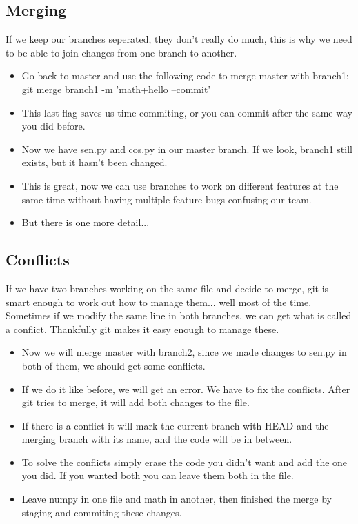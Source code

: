 \documentclass{beamer}
\begin{document}
\subsection{Merging}
\begin{frame}
If we keep our branches seperated, they don't really do much, this is why we 
need to be able to join changes from one branch to another.
\begin{itemize}
\item Go back to master and use the following code to merge master with 
branch1: git merge branch1 -m 'math+hello --commit'
\item This last flag saves us time commiting, or you can commit after the same 
way you did before.
\item Now we have sen.py and cos.py in our master branch. If we look, branch1 
still exists, but it hasn't been changed.
\item This is great, now we can use branches to work on different features at 
the same time without having multiple feature bugs confusing our team.
\item But there is one more detail...
\end{itemize}
\end{frame}

\subsection{Conflicts}
\begin{frame}
If we have two branches working on the same file and decide to merge, git is 
smart enough to work out how to manage them... well most of the time. Sometimes 
if we modify the same line in both branches, we can get what is called a 
conflict. Thankfully git makes it easy enough to manage these.
\begin{itemize}
\item Now we will merge master with branch2, since we made changes to sen.py 
in both of them, we should get some conflicts.
\item If we do it like before, we will get an error. We have to fix the 
conflicts. After git tries to merge, it will add both changes to the file.
\end{itemize}
\end{frame}

\begin{frame}
\begin{itemize}
\item If there is a conflict it will mark the current branch with HEAD 
and the 
merging branch with its name, and the code will be in between.
\item To solve the conflicts simply erase the code you didn't want and add the 
one you did. If you wanted both you can leave them both in the file.
\item Leave numpy in one file and math in another, then finished the merge by 
staging and commiting these changes.
\end{itemize}

\end{frame}
\end{document}
